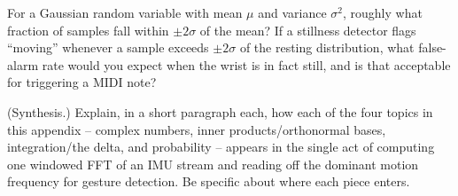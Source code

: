 \begin{exercise}
For a Gaussian random variable with mean $\mu$ and variance $\sigma^2$, roughly what fraction of
samples fall within $\pm 2\sigma$ of the mean? If a stillness detector flags ``moving'' whenever
a sample exceeds $\pm 2\sigma$ of the resting distribution, what false-alarm rate would you
expect when the wrist is in fact still, and is that acceptable for triggering a MIDI note?
\end{exercise}

\begin{exercise}
(Synthesis.) Explain, in a short paragraph each, how each of the four topics in this appendix --
complex numbers, inner products/orthonormal bases, integration/the delta, and probability --
appears in the single act of computing one windowed FFT of an IMU stream and reading off the
dominant motion frequency for gesture detection. Be specific about where each piece enters.
\end{exercise}
